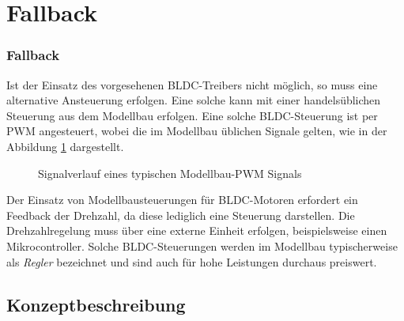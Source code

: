 \ifSTANDALONE
\section{Fallback}
\fi
\ifEMBED
\subsubsection{Fallback}
\fi
Ist der Einsatz des vorgesehenen BLDC-Treibers nicht möglich, so muss eine
alternative Ansteuerung erfolgen. Eine solche kann mit einer handelsüblichen
Steuerung aus dem Modellbau erfolgen. Eine solche BLDC-Steuerung ist per
PWM angesteuert, wobei die im Modellbau üblichen Signale gelten, wie in der
Abbildung \ref{fig:rc-pwm} dargestellt.

\begin{figure}[h!]
	\centering
	\caption{Signalverlauf eines typischen Modellbau-PWM Signals}
	\label{fig:rc-pwm}
\end{figure}

Der Einsatz von Modellbausteuerungen für BLDC-Motoren erfordert ein
Feedback der Drehzahl, da diese lediglich eine Steuerung darstellen. Die
Drehzahlregelung muss über eine externe Einheit erfolgen, beispielsweise einen
Mikrocontroller. Solche BLDC-Steuerungen werden im Modellbau typischerweise als
\emph{Regler} bezeichnet und sind auch für hohe Leistungen durchaus preiswert.

\ifSTANDALONE
\subsection{Konzeptbeschreibung}
\fi
\ifEMBED
